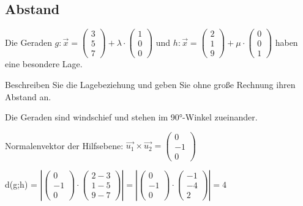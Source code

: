\documentclass{ajc}
\numberwithin{equation}{subsection}
\begin{document}
	\subsection{Abstand}
	Die Geraden $g: \vec{x} = \left(\begin{array}{r} 3 \\ 5 \\ 7\end{array}\right) + \lambda \cdot \left(\begin{array}{r} 1 \\ 0 \\ 0\end{array}\right)$ und $h: \vec{x} = \left(\begin{array}{r} 2 \\ 1 \\ 9\end{array}\right) + \mu \cdot \left(\begin{array}{r} 0 \\ 0 \\ 1\end{array}\right)$ haben eine besondere Lage.
	
	Beschreiben Sie die Lagebeziehung und geben Sie ohne große Rechnung ihren Abstand an.
	
	Die Geraden sind windschief und stehen im 90°-Winkel zueinander.
	
	Normalenvektor der Hilfsebene: $\vec{u_1} \times \vec{u_2} = \left(\begin{array}{r} 0 \\ -1 \\ 0\end{array}\right)$
	
	d(g;h) = $\left| \left(\begin{array}{r} 0 \\ -1 \\ 0\end{array}\right) \cdot \left(\begin{array}{r} 2 - 3 \\ 1 - 5 \\ 9 - 7\end{array}\right) \right| = \left| \left(\begin{array}{r} 0 \\ -1 \\ 0\end{array}\right) \cdot \left(\begin{array}{r} -1 \\ -4 \\ 2\end{array}\right) \right| = 4 $
	
\end{document}
